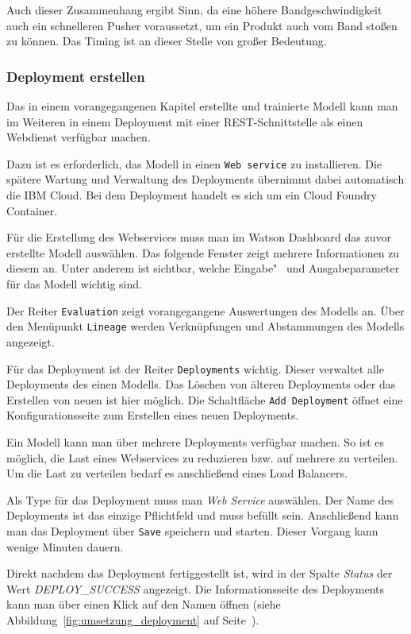 Auch dieser Zusammenhang ergibt Sinn, da eine höhere Bandgeschwindigkeit auch ein schnelleren Pusher voraussetzt, um ein
Produkt auch vom Band stoßen zu können. Das Timing ist an dieser Stelle von großer Bedeutung.

\subsubsection{Deployment erstellen}
\label{subsec:deployment_erstellen}
Das in einem vorangegangenen Kapitel erstellte und trainierte Modell kann man im Weiteren in einem Deployment mit einer
REST-Schnittstelle als einen Webdienst verfügbar machen.

Dazu ist es erforderlich, das Modell in einen \texttt{Web service} zu installieren. Die spätere Wartung und Verwaltung
des Deployments übernimmt dabei automatisch die IBM Cloud. Bei dem Deployment handelt es sich um ein Cloud Foundry
Container.

Für die Erstellung des Webservices muss man im Watson Dashboard das zuvor erstellte Modell auswählen. Das folgende
Fenster zeigt mehrere Informationen zu diesem an. Unter anderem ist sichtbar, welche Eingabe"~ und Ausgabeparameter für
das Modell wichtig sind.

Der Reiter \texttt{Evaluation} zeigt vorangegangene Auswertungen des Modells an. Über den Menüpunkt \texttt{Lineage}
werden Verknüpfungen und Abstammungen des Modells angezeigt.

Für das Deployment ist der Reiter \texttt{Deployments} wichtig. Dieser verwaltet alle Deployments des einen Modells. Das
Löschen von älteren Deployments oder das Erstellen von neuen ist hier möglich. Die Schaltfläche \texttt{Add Deployment}
öffnet eine Konfigurationsseite zum Erstellen eines neuen Deployments.

Ein Modell kann man über mehrere Deployments verfügbar machen. So ist es möglich, die Last eines Webservices zu
reduzieren bzw. auf mehrere zu verteilen. Um die Last zu verteilen bedarf es anschließend eines Load Balancers.

Als Type für das Deployment muss man \textit{Web Service} auswählen. Der Name des Deployments ist das einzige
Pflichtfeld und muss befüllt sein. Anschließend kann man das Deployment über \texttt{Save} speichern und starten. Dieser
Vorgang kann wenige Minuten dauern.

Direkt nachdem das Deployment fertiggestellt ist, wird in der Spalte \textit{Status} der Wert \textit{DEPLOY\_SUCCESS}
angezeigt. Die Informationsseite des Deployments kann man über einen Klick auf den Namen öffnen
(siehe Abbildung~\ref{fig:umsetzung_deployment} auf Seite~\pageref{fig:umsetzung_deployment}).

